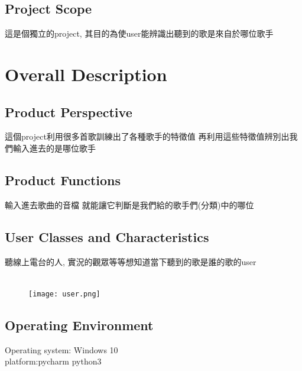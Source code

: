 \documentclass{article}
\begin{document}
\begin{CJK}{UTF8}{bkai}
\subsection{Project Scope\\}
這是個獨立的project, 
其目的為使user能辨識出聽到的歌是來自於哪位歌手

\newpage


\section{\huge\bf \color{blue}  Overall Description\\}

\subsection{\Large Product Perspective\\}
 \large 這個project利用很多首歌訓練出了各種歌手的特徵值 再利用這些特徵值辨別出我們輸入進去的是哪位歌手\\

\subsection{\Large Product Functions}
\large 輸入進去歌曲的音檔 就能讓它判斷是我們給的歌手們(分類)中的哪位\\

\subsection{\Large User Classes and Characteristics\\}
  \Large 聽線上電台的人, 實況的觀眾等等想知道當下聽到的歌是誰的歌的user\\\\%
\begin{figure}[h]
\begin{center}
\texttt{[image: user.png]}
\end{center}
\label{fig:1}
\end{figure}
\newpage
\subsection{\Large Operating Environment \\}
 \Large Operating system: Windows 10\\
platform:pycharm python3\\


\end{CJK}
\end{document}
